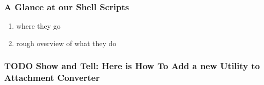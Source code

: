 \documentclass[11pt]{article}
\begin{document}
\subsubsection{A Glance at our Shell Scripts}
\label{sec:orgdeb59e2}

\begin{enumerate}
\item where they go
\label{sec:orgd26cdb6}

\item rough overview of what they do
\label{sec:orgd661974}
\end{enumerate}

\subsubsection{{\bfseries\sffamily TODO} Show and Tell: Here is How To Add a new Utility to Attachment Converter}
\label{sec:orga7d616d}
\end{document}
